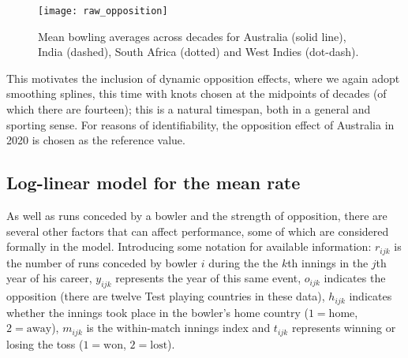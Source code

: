 \documentclass{statsoc}
\newcommand{\pmp}[1]{\textcolor{blue}{#1}}
\begin{document}
\begin{figure}
    \centering
    \texttt{[image: raw\_opposition]}
\caption{Mean bowling averages across decades for Australia (solid line), India (dashed), South Africa (dotted) and West Indies (dot-dash).}
\label{RawOppPlot}
\end{figure}

This motivates the inclusion of dynamic opposition effects, where we again adopt smoothing splines, this time with knots chosen at the midpoints of decades (of which there are fourteen); this is a natural timespan, both in a general and sporting sense. For reasons of identifiability, the opposition effect of Australia in 2020 is chosen as the reference value. %
\subsection{Log-linear model for the mean rate}
As well as runs conceded by a bowler and the strength of opposition, there are several other factors that can affect performance, some of which are considered formally in the model. Introducing some notation for available information: $r_{ijk}$ is the number of runs conceded by bowler $i$ during the the $k$th innings in the $j$th year of his career, $y_{ijk}$ represents the year of this same event, $o_{ijk}$ indicates the opposition (there are twelve Test playing countries in these data), $h_{ijk}$ indicates whether the innings took place in the bowler's home country ($1=\text{home}$, $2=\text{away}$), $m_{ijk}$ is the within-match innings index and $t_{ijk}$ represents winning or losing the toss ($1=\text{won}$, $2=\text{lost}$).
\end{document}
